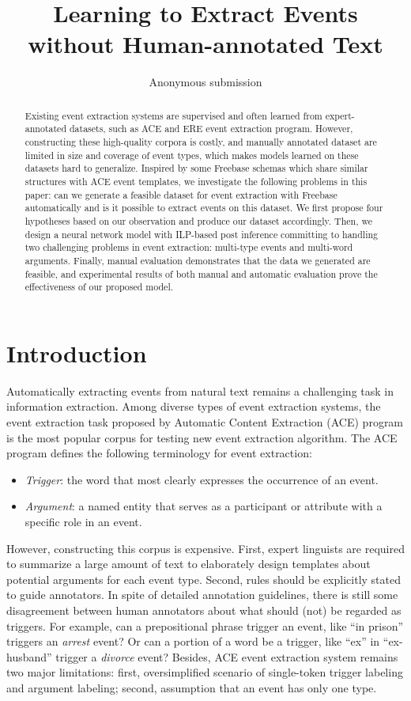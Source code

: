 \documentclass{article}
\title{Learning to Extract Events without Human-annotated Text}
\author{Anonymous submission}
\begin{document}
\maketitle

\begin{abstract}
Existing event extraction systems are supervised and often learned from expert-annotated datasets, such as ACE and ERE event extraction program. However, constructing these high-quality corpora is costly, and manually annotated dataset are limited in size and coverage of event types, which makes models learned on these datasets hard to generalize. Inspired by some Freebase schemas which share similar structures with ACE event templates, we investigate the following problems in this paper: can we generate a feasible dataset for event extraction with Freebase automatically and is it possible to extract events on this dataset. We first propose four hypotheses based on our observation and produce our dataset accordingly. Then, we design a neural network model with ILP-based post inference committing to handling two challenging problems in event extraction: multi-type events and multi-word arguments. Finally, manual evaluation demonstrates that the data we generated are feasible, and experimental results of both manual and automatic evaluation prove the effectiveness of our proposed model.
\end{abstract}

\section{Introduction}
Automatically extracting events from natural text remains a challenging task in information extraction. Among diverse types of event extraction systems, the event extraction task proposed by Automatic Content Extraction (ACE) \cite{doddington2004automatic} program is the most popular corpus for testing new event extraction algorithm. The ACE program defines the following terminology for event extraction:
\begin{itemize}
	\item \emph{Trigger}: the word that most clearly expresses the occurrence of an event.
	\item \emph{Argument}: a named entity that serves as a participant or attribute with a specific role in an event.
\end{itemize}

However, constructing this corpus is expensive. First, expert linguists are required to summarize a large amount of text to elaborately design templates about potential arguments for each event type. Second, rules should be explicitly stated to guide annotators. In spite of detailed annotation guidelines, there is still some disagreement between human annotators about what should (not) be regarded as triggers. For example, can a prepositional phrase trigger an event, like ``in prison'' triggers an \emph{arrest} event? Or can a portion of a word be a trigger, like ``ex'' in ``ex-husband'' trigger a \emph{divorce} event?
Besides, ACE event extraction system remains two major limitations:  first, oversimplified scenario of single-token trigger labeling and argument labeling; second, assumption that an event has only one type.
\end{document}
